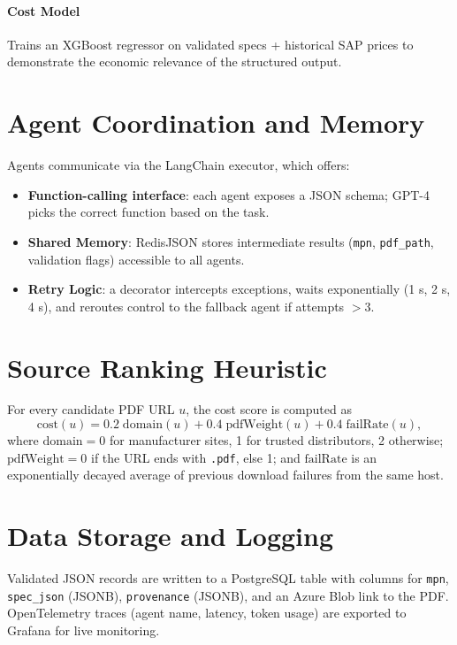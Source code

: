 \paragraph{Cost Model}  
Trains an XGBoost regressor on validated specs + historical SAP prices to demonstrate the economic relevance of the structured output.

\section{Agent Coordination and Memory}
Agents communicate via the LangChain executor, which offers:  
\begin{itemize}
  \item \textbf{Function-calling interface}: each agent exposes a JSON schema; GPT-4 picks the correct function based on the task.  
  \item \textbf{Shared Memory}: RedisJSON stores intermediate results (\verb|mpn|, \verb|pdf_path|, validation flags) accessible to all agents.  
  \item \textbf{Retry Logic}: a decorator intercepts exceptions, waits exponentially (1 s, 2 s, 4 s), and reroutes control to the fallback agent if attempts $>3$.
\end{itemize}

\section{Source Ranking Heuristic}
For every candidate PDF URL $u$, the cost score is computed as
\begin{equation}
\label{eq:heuristic}
\mathrm{cost}(u)=0.2\;\mathrm{domain}(u)+0.4\;\mathrm{pdfWeight}(u)+0.4\;\mathrm{failRate}(u),
\end{equation}
where \(\mathrm{domain}=0\) for manufacturer sites, 1 for trusted distributors, 2 otherwise;  
\(\mathrm{pdfWeight}=0\) if the URL ends with \texttt{.pdf}, else 1;  
and \(\mathrm{failRate}\) is an exponentially decayed average of previous download failures from the same host.

\section{Data Storage and Logging}
Validated JSON records are written to a PostgreSQL table with columns for \verb|mpn|, \verb|spec_json| (JSONB), \verb|provenance| (JSONB), and an Azure Blob link to the PDF.  
OpenTelemetry traces (agent name, latency, token usage) are exported to Grafana for live monitoring.

